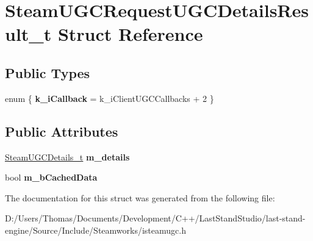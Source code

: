 \hypertarget{structSteamUGCRequestUGCDetailsResult__t}{}\section{Steam\+U\+G\+C\+Request\+U\+G\+C\+Details\+Result\+\_\+t Struct Reference}
\label{structSteamUGCRequestUGCDetailsResult__t}
\subsection*{Public Types}
\begin{DoxyCompactItemize}
\item 
\hypertarget{structSteamUGCRequestUGCDetailsResult__t_a2a9a9a910d9d76656f706a70f6b1d443}{}enum \{ {\bfseries k\+\_\+i\+Callback} = k\+\_\+i\+Client\+U\+G\+C\+Callbacks + 2
 \}\label{structSteamUGCRequestUGCDetailsResult__t_a2a9a9a910d9d76656f706a70f6b1d443}

\end{DoxyCompactItemize}
\subsection*{Public Attributes}
\begin{DoxyCompactItemize}
\item 
\hypertarget{structSteamUGCRequestUGCDetailsResult__t_ada72f6e878ce5a36c9fea199e634cc7e}{}\hyperlink{structSteamUGCDetails__t}{Steam\+U\+G\+C\+Details\+\_\+t} {\bfseries m\+\_\+details}\label{structSteamUGCRequestUGCDetailsResult__t_ada72f6e878ce5a36c9fea199e634cc7e}

\item 
\hypertarget{structSteamUGCRequestUGCDetailsResult__t_a269b81add837184f4276771127b681ba}{}bool {\bfseries m\+\_\+b\+Cached\+Data}\label{structSteamUGCRequestUGCDetailsResult__t_a269b81add837184f4276771127b681ba}

\end{DoxyCompactItemize}


The documentation for this struct was generated from the following file\+:\begin{DoxyCompactItemize}
\item 
D\+:/\+Users/\+Thomas/\+Documents/\+Development/\+C++/\+Last\+Stand\+Studio/last-\/stand-\/engine/\+Source/\+Include/\+Steamworks/isteamugc.\+h\end{DoxyCompactItemize}
